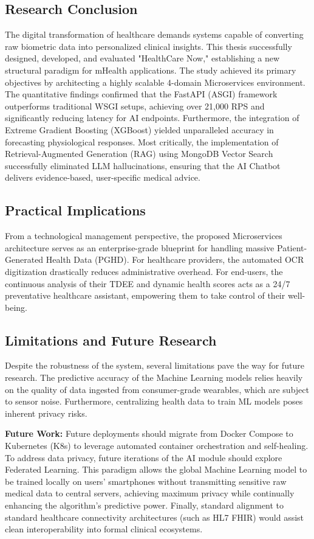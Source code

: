 \documentclass[journal, a4paper]{IEEEtran}
\begin{document}
\subsection{Research Conclusion}
The digital transformation of healthcare demands systems capable of converting raw biometric data into personalized clinical insights. This thesis successfully designed, developed, and evaluated "HealthCare Now," establishing a new structural paradigm for mHealth applications. The study achieved its primary objectives by architecting a highly scalable 4-domain Microservices environment. The quantitative findings confirmed that the FastAPI (ASGI) framework outperforms traditional WSGI setups, achieving over 21,000 RPS and significantly reducing latency for AI endpoints. Furthermore, the integration of Extreme Gradient Boosting (XGBoost) yielded unparalleled accuracy in forecasting physiological responses. Most critically, the implementation of Retrieval-Augmented Generation (RAG) using MongoDB Vector Search successfully eliminated LLM hallucinations, ensuring that the AI Chatbot delivers evidence-based, user-specific medical advice.

\subsection{Practical Implications}
From a technological management perspective, the proposed Microservices architecture serves as an enterprise-grade blueprint for handling massive Patient-Generated Health Data (PGHD). For healthcare providers, the automated OCR digitization drastically reduces administrative overhead. For end-users, the continuous analysis of their TDEE and dynamic health scores acts as a 24/7 preventative healthcare assistant, empowering them to take control of their well-being.

\subsection{Limitations and Future Research}
Despite the robustness of the system, several limitations pave the way for future research. The predictive accuracy of the Machine Learning models relies heavily on the quality of data ingested from consumer-grade wearables, which are subject to sensor noise. Furthermore, centralizing health data to train ML models poses inherent privacy risks.

\textbf{Future Work:} Future deployments should migrate from Docker Compose to Kubernetes (K8s) to leverage automated container orchestration and self-healing. To address data privacy, future iterations of the AI module should explore Federated Learning. This paradigm allows the global Machine Learning model to be trained locally on users' smartphones without transmitting sensitive raw medical data to central servers, achieving maximum privacy while continually enhancing the algorithm's predictive power. Finally, standard alignment to standard healthcare connectivity architectures (such as HL7 FHIR) would assist clean interoperability into formal clinical ecosystems.
\end{document}
